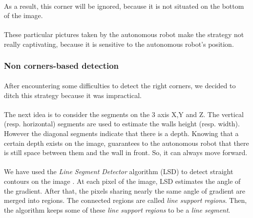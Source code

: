 \documentclass[12pt]{report}
\begin{document}
	 \paragraph{}
	 As a result, this corner will be ignored, because it is not situated on the bottom of the image.
	 
	 \paragraph{}
	 These particular pictures taken by the autonomous robot make the strategy not really captivating, because it is sensitive to the autonomous robot's position.
	 
	 \subsubsection{Non corners-based detection}
	 \paragraph{}
	 After encountering some difficulties to detect the right corners, we decided to ditch this strategy because it was impractical. 
	 
	 \paragraph{}
	 The next idea is to consider the segments on the 3 axis X,Y and Z. The vertical (resp. horizontal) segments are used to estimate the walls height (resp. width). However the diagonal segments indicate that there is a depth. Knowing that a certain depth exists on the image, guarantees to the autonomous robot that there is still space between them and the wall in front. So, it can always move forward.
	  
	  \paragraph{}
	  We have used the \textit{Line Segment Detector} algorithm (LSD) to detect straight contours on the image \cite{grompone_von_gioi_lsd:_2012}. At each pixel of the image, LSD estimates the angle of the gradient. After that, the pixels sharing nearly the same angle of gradient are merged into regions. The connected regions are called \textit{line support regions}. Then, the algorithm keeps some of these \textit{line support regions} to be a \textit{line segment}.
	  
\end{document}
